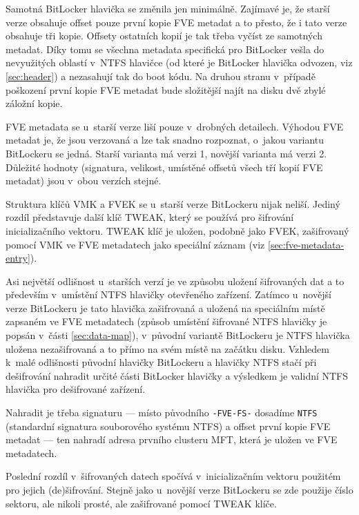Samotná BitLocker hlavička se změnila jen minimálně. Zajímavé je, že starší verze obsahuje offset pouze první kopie FVE metadat a to přesto, že i tato verze obsahuje tři kopie. Offsety ostatních kopií je tak třeba vyčíst ze samotných metadat. Díky tomu se všechna metadata specifická pro BitLocker vešla do nevyužitých oblastí v~NTFS hlavičce (od které je BitLocker hlavička odvozen, viz \ref{sec:header}) a nezasahují tak do boot kódu. Na druhou stranu v~případě poškození první kopie FVE metadat bude složitější najít na disku dvě zbylé záložní kopie.


FVE metadata se u~starší verze liší pouze v~drobných detailech. Výhodou FVE metadat je, že jsou verzovaná a lze tak snadno rozpoznat, o~jakou variantu BitLockeru se jedná. Starší varianta má verzi 1, novější varianta má verzi 2. Důležité hodnoty (signatura, velikost, umístěné offsetů všech tří kopií FVE metadat) jsou v~obou verzích stejné.


Struktura klíčů VMK a FVEK se u~starší verze BitLockeru nijak neliší. Jediný rozdíl představuje další klíč TWEAK, který se používá pro šifrování inicializačního vektoru. TWEAK klíč je uložen, podobně jako FVEK, zašifrovaný pomocí VMK ve FVE metadatech jako speciální záznam (viz \ref{sec:fve-metadata-entry}).


Asi největší odlišnost u~starších verzí je ve způsobu uložení šifrovaných dat a to především v~umístění NTFS hlavičky otevřeného zařízení. Zatímco u~novější verze BitLockeru je tato hlavička zašifrovaná a uložená na speciálním místě zapsaném ve FVE metadatech (způsob umístění šifrované NTFS hlavičky je popsán v~části \ref{sec:data-map}), v~původní variantě BitLockeru je NTFS hlavička uložena nezašifrovaná a to přímo na svém  místě na začátku disku. Vzhledem k~malé odlišnosti původní hla\-vič\-ky BitLockeru a hlavičky NTFS stačí při dešifrování nahradit určité části BitLocker hlavičky a výsledkem je validní NTFS hlavička pro dešifrované zařízení. 

Nahradit je třeba signaturu --- místo původního \texttt{-FVE-FS-} dosadíme \texttt{NTFS} (standardní signatura souborového systému NTFS) a offset první kopie FVE metadat --- ten nahradí adresa prvního clusteru MFT, která je uložen ve FVE metadatech.\cite{Metz2011}

Poslední rozdíl v~šifrovaných datech spočívá v~inicializačním vektoru použitém pro jejich (de)šifrování. Stejně jako u~novější verze BitLockeru se zde použije číslo sektoru, ale nikoli prosté, ale zašifrované pomocí TWEAK klíče.

